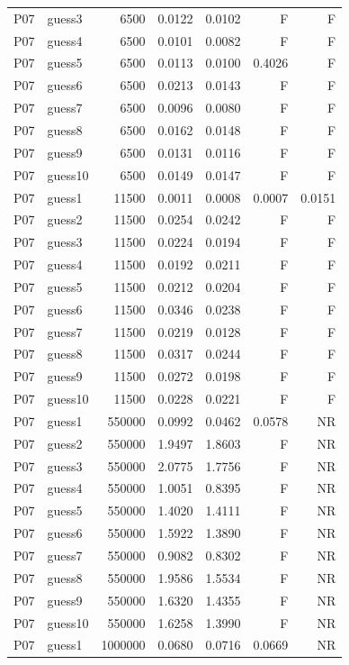 {\begin{longtable}{llrrrrr}
P07 & guess3 & 6500 & 0.0122 & 0.0102 & F & F \\
P07 & guess4 & 6500 & 0.0101 & 0.0082 & F & F \\
P07 & guess5 & 6500 & 0.0113 & 0.0100 & 0.4026 & F \\
P07 & guess6 & 6500 & 0.0213 & 0.0143 & F & F \\
P07 & guess7 & 6500 & 0.0096 & 0.0080 & F & F \\
P07 & guess8 & 6500 & 0.0162 & 0.0148 & F & F \\
P07 & guess9 & 6500 & 0.0131 & 0.0116 & F & F \\
P07 & guess10 & 6500 & 0.0149 & 0.0147 & F & F \\
P07 & guess1 & 11500 & 0.0011 & 0.0008 & 0.0007 & 0.0151 \\
P07 & guess2 & 11500 & 0.0254 & 0.0242 & F & F \\
P07 & guess3 & 11500 & 0.0224 & 0.0194 & F & F \\
P07 & guess4 & 11500 & 0.0192 & 0.0211 & F & F \\
P07 & guess5 & 11500 & 0.0212 & 0.0204 & F & F \\
P07 & guess6 & 11500 & 0.0346 & 0.0238 & F & F \\
P07 & guess7 & 11500 & 0.0219 & 0.0128 & F & F \\
P07 & guess8 & 11500 & 0.0317 & 0.0244 & F & F \\
P07 & guess9 & 11500 & 0.0272 & 0.0198 & F & F \\
P07 & guess10 & 11500 & 0.0228 & 0.0221 & F & F \\
P07 & guess1 & 550000 & 0.0992 & 0.0462 & 0.0578 & NR \\
P07 & guess2 & 550000 & 1.9497 & 1.8603 & F & NR \\
P07 & guess3 & 550000 & 2.0775 & 1.7756 & F & NR \\
P07 & guess4 & 550000 & 1.0051 & 0.8395 & F & NR \\
P07 & guess5 & 550000 & 1.4020 & 1.4111 & F & NR \\
P07 & guess6 & 550000 & 1.5922 & 1.3890 & F & NR \\
P07 & guess7 & 550000 & 0.9082 & 0.8302 & F & NR \\
P07 & guess8 & 550000 & 1.9586 & 1.5534 & F & NR \\
P07 & guess9 & 550000 & 1.6320 & 1.4355 & F & NR \\
P07 & guess10 & 550000 & 1.6258 & 1.3990 & F & NR \\
P07 & guess1 & 1000000 & 0.0680 & 0.0716 & 0.0669 & NR \\

\end{longtable}}
